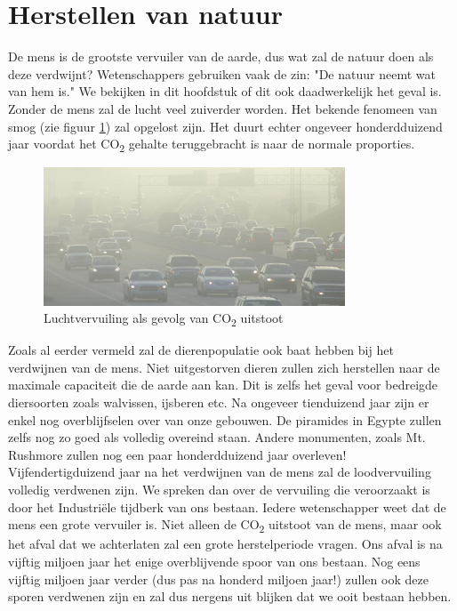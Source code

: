 \section{Herstellen van natuur}
De mens is de grootste vervuiler van de aarde, dus wat zal de natuur doen als deze verdwijnt? Wetenschappers gebruiken vaak de zin: "De natuur neemt wat van hem is." We bekijken in dit hoofdstuk of dit ook daadwerkelijk het geval is.
\newline
\newline
Zonder de mens zal de lucht veel zuiverder worden. Het bekende fenomeen van smog (zie figuur \ref{fig:smog}) zal opgelost zijn. Het duurt echter ongeveer honderdduizend jaar voordat het \texorpdfstring{CO\textsubscript{2}}{2} gehalte teruggebracht is naar de normale proporties. 
\begin{figure}[h]
	\centering
	\includegraphics[width=0.8\textwidth]{LuchtVervuiling.jpg}
	\caption{Luchtvervuiling als gevolg van \texorpdfstring{CO\textsubscript{2}}{2} uitstoot \cite{Pollution}}
	\label{fig:smog}
\end{figure}
\newline
Zoals al eerder vermeld zal de dierenpopulatie ook baat hebben bij het verdwijnen van de mens. Niet uitgestorven dieren zullen zich herstellen naar de maximale capaciteit die de aarde aan kan. Dit is zelfs het geval voor bedreigde diersoorten zoals walvissen, ijsberen etc.
\newline
Na ongeveer tienduizend jaar zijn er enkel nog overblijfselen over van onze gebouwen. De piramides in Egypte zullen zelfs nog zo goed als volledig overeind staan. Andere monumenten, zoals Mt. Rushmore zullen nog een paar honderdduizend jaar overleven!
\newline
Vijfendertigduizend jaar na het verdwijnen van de mens zal de loodvervuiling volledig verdwenen zijn. We spreken dan over de vervuiling die veroorzaakt is door het Industri\"{e}le tijdberk van ons bestaan.
\newline
Iedere wetenschapper weet dat de mens een grote vervuiler is. Niet alleen de \texorpdfstring{CO\textsubscript{2}}{2} uitstoot van de mens, maar ook het afval dat we achterlaten zal een grote herstelperiode vragen. Ons afval is na vijftig miljoen jaar het enige overblijvende spoor van ons bestaan. Nog eens vijftig miljoen jaar verder (dus pas na honderd miljoen jaar!) zullen ook deze sporen verdwenen zijn en zal dus nergens uit blijken dat we ooit bestaan hebben.
